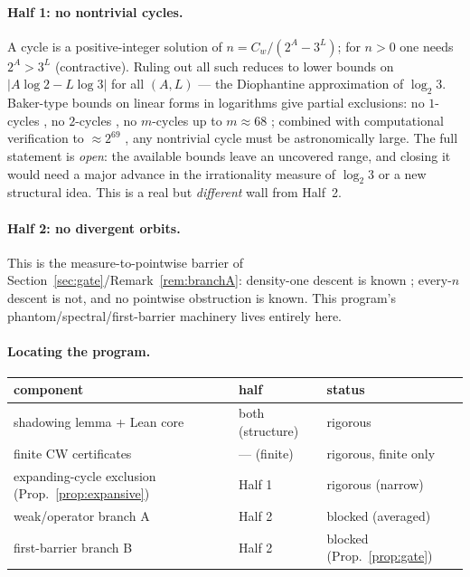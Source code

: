 \documentclass[11pt,a4paper]{article}
\theoremstyle{definition}
\begin{document}
\paragraph{Half 1: no nontrivial cycles.}
A cycle is a positive-integer solution of $n = C_w/(2^{A} - 3^{L})$; for
$n>0$ one needs $2^A > 3^L$ (contractive). Ruling out all such reduces to
lower bounds on $|A\log 2 - L\log 3|$ for all $(A,L)$ --- the Diophantine
approximation of $\log_2 3$. Baker-type bounds on linear forms in
logarithms give partial exclusions: no $1$-cycles \cite{steiner1977}, no
$2$-cycles \cite{simons2005}, no $m$-cycles up to $m \approx 68$
\cite{simonsdeweger2005}; combined with computational verification to
$\approx 2^{69}$ \cite{barina2021}, any nontrivial cycle must be
astronomically large. The full statement is \emph{open}: the available
bounds leave an uncovered range, and closing it would need a major advance
in the irrationality measure of $\log_2 3$ or a new structural idea. This
is a real but \emph{different} wall from Half~2.

\paragraph{Half 2: no divergent orbits.}
This is the measure-to-pointwise barrier of
Section~\ref{sec:gate}/Remark~\ref{rem:branchA}: density-one descent is
known \cite{terras1976, tao2019}; every-$n$ descent is not, and no
pointwise obstruction is known. This program's phantom/spectral/first-barrier
machinery lives entirely here.

\paragraph{Locating the program.}
\begin{center}
\begin{tabular}{lll}
\toprule
component & half & status \\
\midrule
shadowing lemma + Lean core & both (structure) & rigorous \\
finite CW certificates & --- (finite) & rigorous, finite only \\
expanding-cycle exclusion (Prop.~\ref{prop:expansive}) & Half 1 & rigorous (narrow) \\
weak/operator branch A & Half 2 & blocked (averaged) \\
first-barrier branch B & Half 2 & blocked (Prop.~\ref{prop:gate}) \\
\bottomrule
\end{tabular}
\end{center}
\end{document}
